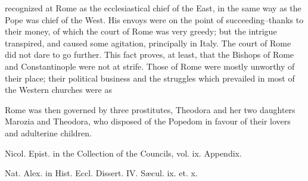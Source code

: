 recognized at Rome as the ecclesiastical chief of the East, in the same way as the Pope was chief of the West. His envoys were on the point of succeeding--thanks to their money, of which the court of Rome was very greedy; but the intrigue transpired, and caused some agitation, principally in Italy. The court of Rome did not dare to go further. This fact proves, at least, that the Bishops of Rome and Constantinople were not at strife. Those of Rome were mostly unworthy of their place; their political business and the struggles which prevailed in most of the Western churches were as

Rome was then governed by three prostitutes, Theodora and her two daughters Marozia and Theodora, who disposed of the Popedom in favour of their lovers and adulterine children.

Nicol. Epist. in the Collection of the Councils, vol. ix. Appendix.

Nat. Alex. in Hist. Eccl. Dissert. IV. Sæcul. ix. et. x.

